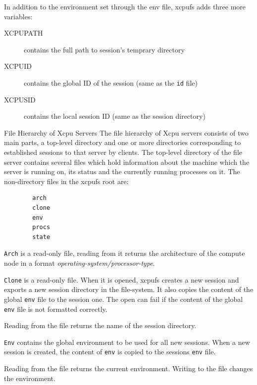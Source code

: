 \documentclass[11pt]{p9article}
\makeatletter
\renewcommand\section{\@startsection {section}{1}{\z@} {3pt} {1pt} {\normalfont\normalsize\bfseries}}
\makeatother
\begin{document}
In addition to the environment set through the env file, xcpufs adds three
more variables:

\begin{description}

\item[XCPUPATH] contains the full path to session's temprary directory
\item[XCPUID] contains the global ID of the session (same as the {\tt id} file)
\item[XCPUSID] contains the local session ID (same as the session directory)

\end{description}

\section{File Hierarchy of Xcpu Servers}
The file hierarchy of Xcpu servers consists of two main parts, a
top-level directory and one or more directories corresponding to
established sessions to that server by clients. The top-level
directory of the file server contains several files which hold
information about the machine which the server is running on, its
status and the currently running processes on it. The non-directory
files in the xcpufs root are:

\begin{verbatim}
        arch
        clone
        env
        procs
        state
\end{verbatim}

\verb|Arch| is a read-only file, reading from it returns the architecture of
the compute node in a format {\sl operating-system/processor-type}.

\verb|Clone| is a read-only file. When it is opened, xcpufs creates a new
session and exports a new session directory in the file-system. It also
copies the content of the global \verb|env| file to the session one. The
open can fail if the content of the global \verb|env| file is not formatted
correctly. 

Reading from the file returns the name of the session directory. 

\verb|Env| contains the global environment to be used for all new sessions.
When a new session is created, the content of \verb|env| is copied to the
sessions \verb|env| file.

Reading from the file returns the current environment. Writing to the file
changes the environment. 
\end{document}
